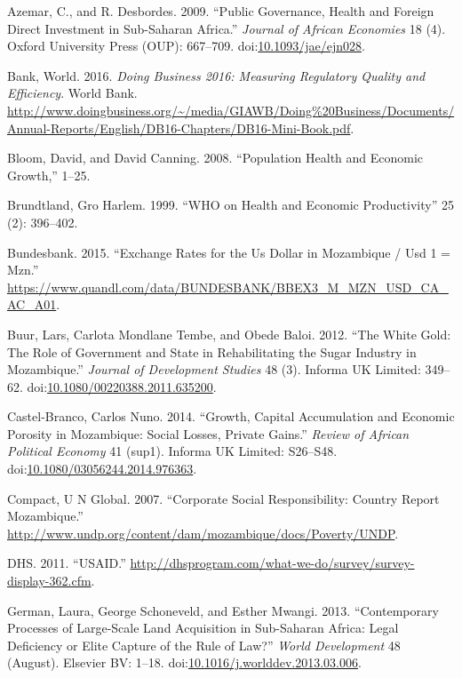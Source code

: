 \documentclass[]{elsarticle} %
\begin{document}
\hypertarget{ref-Azemar2009}{}
Azemar, C., and R. Desbordes. 2009. ``Public Governance, Health and
Foreign Direct Investment in Sub-Saharan Africa.'' \emph{Journal of
African Economies} 18 (4). Oxford University Press (OUP): 667--709.
doi:\href{https://doi.org/10.1093/jae/ejn028}{10.1093/jae/ejn028}.

\hypertarget{ref-doingbusiness}{}
Bank, World. 2016. \emph{Doing Business 2016: Measuring Regulatory
Quality and Efficiency}. World Bank.
\url{http://www.doingbusiness.org/~/media/GIAWB/Doing\%20Business/Documents/Annual-Reports/English/DB16-Chapters/DB16-Mini-Book.pdf}.

\hypertarget{ref-Bloom2008}{}
Bloom, David, and David Canning. 2008. ``Population Health and Economic
Growth,'' 1--25.

\hypertarget{ref-World1999}{}
Brundtland, Gro Harlem. 1999. ``WHO on Health and Economic
Productivity'' 25 (2): 396--402.

\hypertarget{ref-deutsche}{}
Bundesbank. 2015. ``Exchange Rates for the Us Dollar in Mozambique / Usd
1 = Mzn.''
\url{https://www.quandl.com/data/BUNDESBANK/BBEX3_M_MZN_USD_CA_AC_A01}.

\hypertarget{ref-Buur2012}{}
Buur, Lars, Carlota Mondlane Tembe, and Obede Baloi. 2012. ``The White
Gold: The Role of Government and State in Rehabilitating the Sugar
Industry in Mozambique.'' \emph{Journal of Development Studies} 48 (3).
Informa UK Limited: 349--62.
doi:\href{https://doi.org/10.1080/00220388.2011.635200}{10.1080/00220388.2011.635200}.

\hypertarget{ref-CastelBranco2014}{}
Castel-Branco, Carlos Nuno. 2014. ``Growth, Capital Accumulation and
Economic Porosity in Mozambique: Social Losses, Private Gains.''
\emph{Review of African Political Economy} 41 (sup1). Informa UK
Limited: S26--S48.
doi:\href{https://doi.org/10.1080/03056244.2014.976363}{10.1080/03056244.2014.976363}.

\hypertarget{ref-Compact2007}{}
Compact, U N Global. 2007. ``Corporate Social Responsibility: Country
Report Mozambique.''
\url{http://www.undp.org/content/dam/mozambique/docs/Poverty/UNDP}.

\hypertarget{ref-dhs}{}
DHS. 2011. ``USAID.''
\url{http://dhsprogram.com/what-we-do/survey/survey-display-362.cfm}.

\hypertarget{ref-German2013}{}
German, Laura, George Schoneveld, and Esther Mwangi. 2013.
``Contemporary Processes of Large-Scale Land Acquisition in Sub-Saharan
Africa: Legal Deficiency or Elite Capture of the Rule of Law?''
\emph{World Development} 48 (August). Elsevier BV: 1--18.
doi:\href{https://doi.org/10.1016/j.worlddev.2013.03.006}{10.1016/j.worlddev.2013.03.006}.
\end{document}
